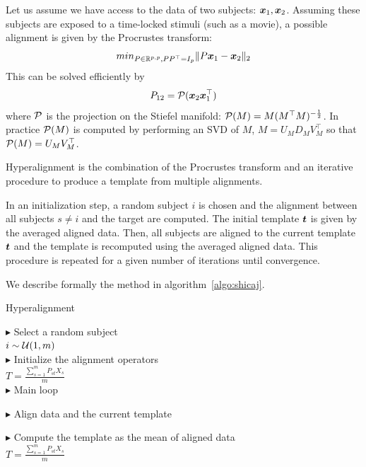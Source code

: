 Let us assume we have access to the data of two subjects: $\boldsymbol{x}_1, \boldsymbol{x}_2$.
Assuming these subjects are exposed to a time-locked stimuli (such as a movie), a possible alignment is given by the Procrustes transform:
\begin{align}
min_{P \in \mathbb{R}^{p, p}, PP^{\top} = I_p} \|P \boldsymbol{x}_1 - \boldsymbol{x}_2 \|_2
\end{align}
This can be solved efficiently by
\begin{align}
  P_{12} = \mathcal{P}(\boldsymbol{x}_2 \boldsymbol{x}_1^{\top})
\end{align}
where $\mathcal{P}$ is the projection on the Stiefel manifold: $\mathcal{P}(M) = M
(M^{\top}M)^{-\frac12}$. In practice $\mathcal{P}(M)$ is computed by performing an SVD
of $M$, $M = U_M D_M V_M^{\top} $ so that $\mathcal{P}(M) = U_M V_M^{\top}$.

Hyperalignment is the combination of the Procrustes transform and an iterative
procedure to produce a template from multiple alignments.

In an initialization step, a random subject $i$ is chosen and the alignment
between all subjects $s \neq i$ and the target are computed. The initial
template $\boldsymbol{t}$ is given by the averaged aligned data. Then, all subjects are
aligned to the current template $\boldsymbol{t}$ and the template is recomputed using the
averaged aligned data. This procedure is repeated for a given number of
iterations until convergence.

We describe formally
the method in algorithm~\ref{algo:shicaj}.

\begin{algorithm}[H]
  \SetAlgoLined
  \caption{Hyperalignment}
  \label{algo:shicaj}
  $\blacktriangleright$ Select a random subject \\
  $i \sim \mathcal{U}(1, m)$ \\
  $\blacktriangleright$ Initialize the alignment operators \\
  $T = \frac{\sum_{s=1}^m P_{st} X_s}{m}$ \\

  $\blacktriangleright$ Main loop \\
  {
    $\blacktriangleright$ Align data and the current template \\

    $\blacktriangleright$ Compute the template as the mean of aligned data \\
    $T = \frac{\sum_{s=1}^m P_{st} X_s}{m}$ \\
    }
\end{algorithm}



